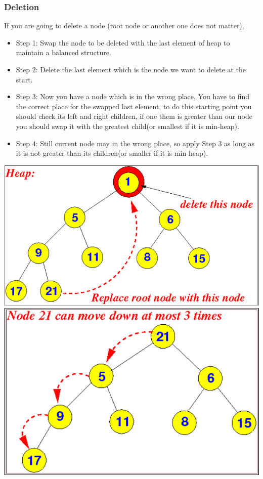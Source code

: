 \documentclass[12pt]{article}
\begin{document}
     \subsubsection{Deletion}
        If you are going to delete a node (root node or another one does not matter), 
        \begin{itemize}
            \item Step 1:  Swap the node to be deleted with the last element of heap to maintain a balanced structure.
            \item Step 2: Delete the last element which is the node we want to delete at the start.
            \item Step 3: Now you have a node which is in the wrong place, You have to find the correct place for the swapped last element, to do this starting point you should check its left and right children, if one them is greater than our node you should swap it with the greatest child(or smallest if it is min-heap).
            \item Step 4: Still current node may in the wrong place, so apply Step 3 as long as it is not greater than its children(or smaller if it is min-heap).
        \end{itemize}
        \includegraphics[width=\linewidth/2 ]{heap1.png} \includegraphics[width=\linewidth/2 ]{heap2.png}
\end{document}
